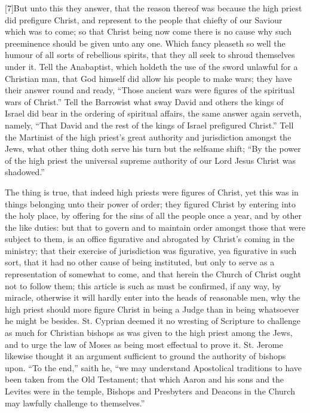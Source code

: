 [7]But unto this they answer, that the reason thereof was because the high priest did prefigure Christ, and represent to the people that chiefty of our Saviour which was to come; so that Christ being now come there is no cause why such preeminence should be given unto any one. Which fancy pleaseth so well the humour of all sorts of rebellious spirits, that they all seek to shroud themselves under it. Tell the Anabaptist, which holdeth the use of the sword unlawful for a Christian man, that God himself did allow his people to  make wars; they have their answer round and ready, “Those ancient wars were figures of the spiritual wars of Christ.” Tell the Barrowist what sway David and others the kings of Israel did bear in the ordering of spiritual affairs, the same answer again serveth, namely, “That David and the rest of the kings of Israel prefigured Christ.” Tell the Martinist of the high priest’s great authority and jurisdiction amongst the Jews, what other thing doth serve his turn but the selfsame shift; “By the power of the high priest the universal supreme authority of our Lord Jesus Christ was shadowed.”

The thing is true, that indeed high priests were figures of Christ, yet this was in things belonging unto their power of order; they figured Christ by entering into the holy place, by offering for the sins of all the people once a year, and by other the like duties: but that to govern and to maintain order amongst those that were subject to them, is an office figurative and abrogated by Christ’s coming in the ministry; that their exercise of jurisdiction was figurative, yea figurative in such sort, that it had no other cause of being instituted, but only to serve as a representation of somewhat to come, and that herein the Church of Christ ought not to follow them; this article is such as must be confirmed, if any way, by miracle, otherwise it will hardly enter into the heads of reasonable men, why the high priest should more figure Christ in being a Judge than in being whatsoever he might be besides. St. Cyprian deemed it no wresting of Scripture  to challenge as much for Christian bishops as was given to the high priest among the Jews,
 and to urge the law of Moses as being most effectual to prove it. St. Jerome likewise thought it an argument sufficient to ground the authority of bishops upon. “To the end,” saith he, “we may understand Apostolical traditions to have been taken from the Old Testament; that which Aaron and his sons and the Levites were in the temple, Bishops and Presbyters and Deacons in the Church may lawfully challenge to themselves.”

